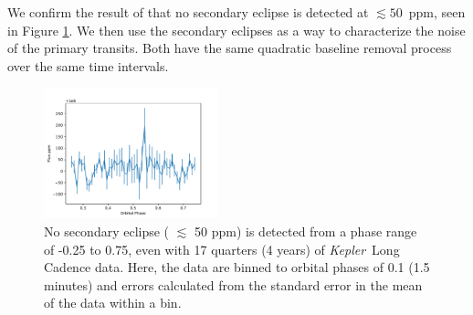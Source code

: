 \documentclass[preprint]{aastex61}
\newcommand{\kepler}{{\it Kepler}}
\begin{document}
We confirm the result of \citet{vanWerkhoven2014} that no secondary eclipse is detected at $\lesssim 50$~ppm, seen in Figure \ref{fig:secEclipse}. 
We then use the secondary eclipses as a way to characterize the noise of the primary transits.
Both have the same quadratic baseline removal process over the same time intervals.

\begin{figure}[!hbtp]
\begin{centering}
\includegraphics[width=0.45\textwidth]{images/kepler/secondary_eclipse.pdf}
\caption{No secondary eclipse ( $\lesssim$ 50 ppm) is detected from a phase range of -0.25 to 0.75, even with 17 quarters (4 years) of \kepler\ Long Cadence data.
Here, the data are binned to orbital phases of 0.1 (1.5 minutes) and errors calculated from the standard error in the mean of the data within a bin.
}\label{fig:secEclipse}
\end{centering}
\end{figure}
\end{document}
